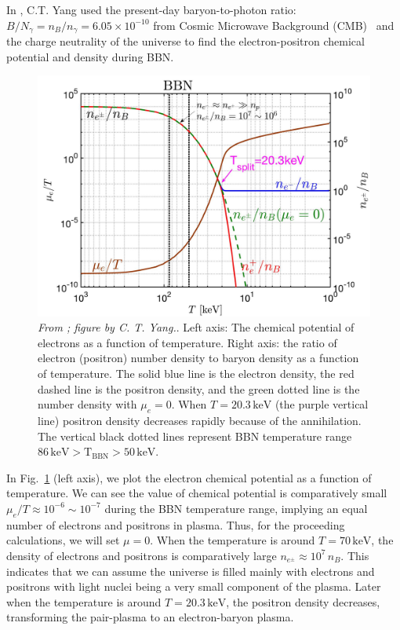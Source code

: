 In \citep{Grayson:2022asf}, C.T. Yang used the present-day baryon-to-photon ratio: $B/N_\gamma =n_B/n_\gamma= 6.05\times10^{-10}$ from Cosmic Microwave Background (CMB)~\citep{ParticleDataGroup:2022pth} and the charge neutrality of the universe to find the electron-positron chemical potential and density during BBN.

\begin{figure}[ht]
\begin{center}
\includegraphics[width=0.95\linewidth]{plots/chap03BBN/May152023_EPDensity_Chemical}
\caption{\textit{From \cite{Grayson:2023flr}; figure by C. T. Yang.}. Left axis: The chemical potential of electrons as a function of temperature. Right axis: the ratio of electron (positron) number density to baryon density as a function of temperature. The solid blue line is the electron density, the red dashed line is the positron density, and the green dotted line is the number density with $\mu_e=0$. When $T=20.3\,\mathrm{keV}$ (the purple vertical line) positron density decreases rapidly because of the annihilation. The vertical black dotted lines represent BBN temperature range $86\,\mathrm{keV}>\mathrm{T_{BBN}}>50\,\mathrm{keV}$.}
\label{BBN_Electron}
\end{center}
\end{figure}

In Fig.~\ref{BBN_Electron} (left axis), we plot the electron chemical potential as a function of temperature. We can see the value of chemical potential is comparatively small $\mu_e/T\approx10^{-6}\sim10^{-7}$ during the BBN temperature range, implying an equal number of electrons and positrons in plasma. Thus, for the proceeding calculations, we will set $\mu =0$.  When the temperature is around $T=70\,\mathrm{keV}$, the density of electrons and positrons is comparatively large $n_{e^\pm}\approx10^7\,n_B$. This indicates that we can assume the universe is filled mainly with electrons and positrons with light nuclei being a very small component of the plasma. Later when the temperature is around $T=20.3\,\mathrm{keV}$, the positron density decreases, transforming the pair-plasma to an electron-baryon plasma.



